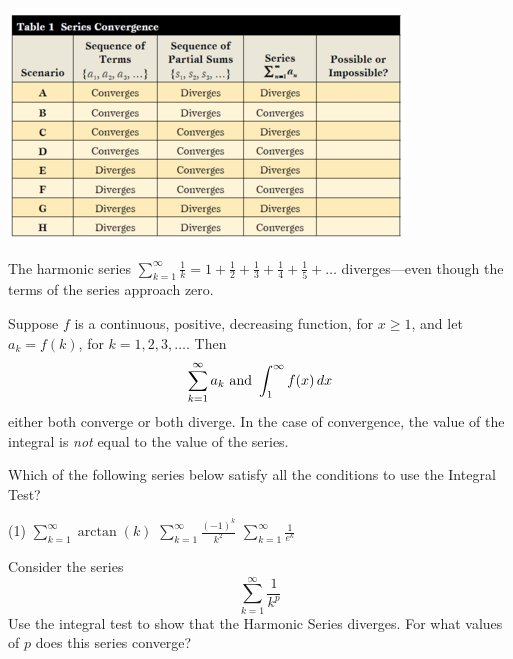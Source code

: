 \documentclass[../mathNotesPreamble]{subfiles}
\begin{document}
  \begin{center}
    \includegraphics[width=0.8\linewidth]{../images/briggs_10_04/PossibleImpossibleSeriesTable}
  \end{center}
  \begin{thmBox*}
    The harmonic series $\displaystyle\sum_{k=1}^\infty\frac{1}{k}=1+\frac{1}{2}+\frac{1}{3}+\frac{1}{4}+\frac{1}{5}+\dots$ diverges---even though the terms of the series approach zero.
  \end{thmBox*}
  \pagebreak

  \begin{thmBox*}
    Suppose $f$ is a continuous, positive, decreasing function, for $x\geq 1$, and let $a_k=f(k)$, for $k=1,2,3,\dots$. Then
      \[\sum_{k=1}^\infty a_k \textnormal{ and } \int_1^\infty f(x)\,dx\]
    either both converge or both diverge. In the case of convergence, the value of the integral is \textit{not} equal to the value of the series.
  \end{thmBox*}
  \begin{ex*}
    Which of the following series below satisfy all the conditions to use the Integral Test?
  \end{ex*}
  \begin{tasks}[after-item-skip=\stretch{1}, label=,item-indent=0pt](1)
    \task $\displaystyle\sum_{k=1}^\infty \arctan(k)$
    \task $\displaystyle\sum_{k=1}^\infty \frac{(-1)^k}{k^2}$
    \task $\displaystyle\sum_{k=1}^\infty \frac{1}{e^k}$
  \end{tasks}
  \pagebreak

  \begin{ex*}
    Consider the series
      \[\sum_{k=1}^\infty \frac{1}{k^p}\]
    Use the integral test to show that the Harmonic Series diverges. For what values of $p$ does this series converge?
  \end{ex*}
  \pagebreak
\end{document}
